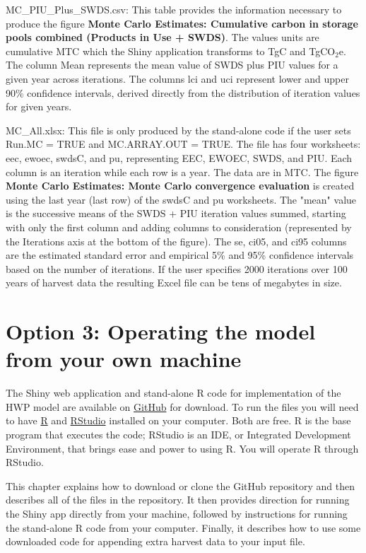 \documentclass[
  openany]{book}
\begin{document}
MC\_PIU\_Plus\_SWDS.csv: This table provides the information necessary to produce the figure \textbf{Monte Carlo Estimates: Cumulative carbon in storage pools combined (Products in Use + SWDS)}. The values units are cumulative MTC which the Shiny application transforms to TgC and TgCO\(_2\)e. The column Mean represents the mean value of SWDS plus PIU values for a given year across iterations. The columns lci and uci represent lower and upper 90\% confidence intervals, derived directly from the distribution of iteration values for given years.

MC\_All.xlsx: This file is only produced by the stand-alone code if the user sets Run.MC = TRUE and MC.ARRAY.OUT = TRUE. The file has four worksheets: eec, ewoec, swdsC, and pu, representing EEC, EWOEC, SWDS, and PIU. Each column is an iteration while each row is a year. The data are in MTC. The figure \textbf{Monte Carlo Estimates: Monte Carlo convergence evaluation} is created using the last year (last row) of the swdsC and pu worksheets. The "mean" value is the successive means of the SWDS + PIU iteration values summed, starting with only the first column and adding columns to consideration (represented by the Iterations axis at the bottom of the figure). The se, ci05, and ci95 columns are the estimated standard error and empirical 5\% and 95\% confidence intervals based on the number of iterations. If the user specifies 2000 iterations over 100 years of harvest data the resulting Excel file can be tens of megabytes in size.

\hypertarget{dnld}{%
\chapter{Option 3: Operating the model from your own machine}\label{dnld}}

The Shiny \autocite{R-shiny} web application and stand-alone R code for implementation of the HWP model are available on \href{https://github.com/}{GitHub} for download. To run the files you will need to have \href{https://www.r-project.org/}{R} and \href{https://www.rstudio.com/products/rstudio/}{RStudio} installed on your computer. Both are free. R is the base program that executes the code; RStudio is an IDE, or Integrated Development Environment, that brings ease and power to using R. You will operate R through RStudio.

This chapter explains how to download or clone the GitHub repository and then describes all of the files in the repository. It then provides direction for running the Shiny app directly from your machine, followed by instructions for running the stand-alone R code from your computer. Finally, it describes how to use some downloaded code for appending extra harvest data to your input file.
\end{document}
